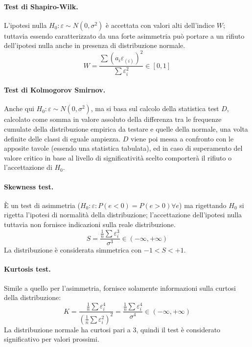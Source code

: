 \documentclass[a4page, 11pt]{article} %
\begin{document}
\paragraph{Test di Shapiro-Wilk.} L'ipotesi nulla $H_0 : \varepsilon \sim N(0, \sigma^2)$ è accettata con valori alti dell'indice $W$; tuttavia essendo caratterizzato da una forte asimmetria può portare a un rifiuto dell'ipotesi nulla anche in presenza di distribuzione normale.
\begin{equation*}
W = \frac{\sum(a_i \varepsilon_{(i)})^2}{\sum\varepsilon_i^2} \in [0, 1]
\end{equation*}

\paragraph{Test di Kolmogorov Smirnov.} Anche qui $H_0 : \varepsilon \sim N(0, \sigma^2)$, ma si basa sul calcolo della statistica test $D$, calcolato come somma in valore assoluto della differenza tra le frequenze cumulate della distribuzione empirica da testare e quelle della normale, una volta definite delle classi di eguale ampiezza.
$D$ viene poi messa a confronto con le apposite tavole (essendo una statistica tabulata), ed in caso di superamento del valore critico in base al livello di significatività scelto comporterà il rifiuto o l'accettazione di $H_0$.

\paragraph{Skewness test.} È un test di asimmetria ($H_0 : \varepsilon : P(e < 0) = P(e > 0) \forall e$) ma rigettando $H_0$ si rigetta l'ipotesi di normalità della distribuzione; l'accettazione dell'ipotesi nulla tuttavia non fornisce indicazioni sulla reale distribuzione.
\begin{equation*}
  S = \frac{\frac{1}{n}\sum\varepsilon_i^3}{\sigma^3} \in (-\infty, +\infty)
\end{equation*}
La distribuzione è considerata simmetrica con $-1 < S < +1$.
\paragraph{Kurtosis test.} Simile a quello per l'asimmetria, fornisce solamente informazioni sulla curtosi della distribuzione:
\begin{equation*}
  K = \frac{\frac{1}{n}\sum\varepsilon_i^4}{(\frac{1}{n}\sum\varepsilon_i^2)^2} = \frac{\frac{1}{n}\sum\varepsilon_i^4}{\sigma^4} \in (-\infty, +\infty)
\end{equation*}
La distribuzione normale ha curtosi pari a $3$, quindi il test è considerato significativo per valori prossimi. \newline
\end{document}
